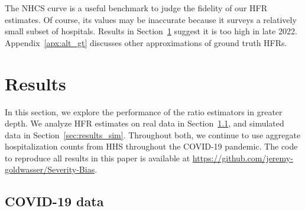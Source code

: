 \documentclass{article}
\begin{document}
The NHCS curve is a useful benchmark to judge the fidelity of our HFR estimates. Of course, its values may be inaccurate because it surveys a relatively small subset of hospitals. Results in Section~\ref{sec:results} suggest it is too high in late 2022. Appendix~\ref{apx:alt_gt} discusses other approximations of ground truth HFRs. 

\section{Results}\label{sec:results}

In this section, we explore the performance of the ratio estimators in greater depth. 
We analyze HFR estimates on real data in Section~\ref{sec:results_real}, and simulated data in Section~\ref{sec:results_sim}. Throughout both, we continue to use aggregate hospitalization counts from HHS throughout the COVID-19 pandemic. 
The code to reproduce all results in this paper is available at
\url{https://github.com/jeremy-goldwasser/Severity-Bias}. 

\subsection{COVID-19 data}\label{sec:results_real}
\end{document}
